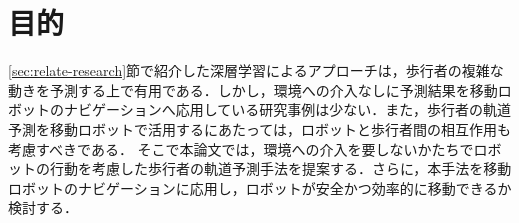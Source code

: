 
\section{目的}
\ref{sec:relate-research}節で紹介した深層学習によるアプローチは，歩行者の複雑な動きを予測する上で有用である．しかし，環境への介入なしに予測結果を移動ロボットのナビゲーションへ応用している研究事例は少ない．また，歩行者の軌道予測を移動ロボットで活用するにあたっては，ロボットと歩行者間の相互作用も考慮すべきである．
そこで本論文では，環境への介入を要しないかたちでロボットの行動を考慮した歩行者の軌道予測手法を提案する．さらに，本手法を移動ロボットのナビゲーションに応用し，ロボットが安全かつ効率的に移動できるか検討する．

